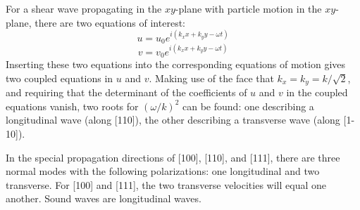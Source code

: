 \documentclass[10pt]{article}
\begin{document}
For a shear wave propagating in the $xy$-plane with particle motion in the $xy$-plane, there are two equations of interest:
$$
u = u_{0}e^{i(k_{x}x + k_{y}y - \omega t)}
$$
$$
v = v_{0}e^{i(k_{x}x + k_{y}y - \omega t)}
$$
Inserting these two equations into the corresponding equations of motion gives two coupled equations in $u$ and $v$. Making use of the
face that $k_{x} = k_{y} = k/\sqrt{2}$, and requiring that the determinant of the coefficients of $u$ and $v$ in the coupled equations vanish, two roots
for $(\omega/k)^{2}$ can be found: one describing a longitudinal wave (along [110]), the other describing a transverse wave (along [1-10]).

In the special propagation directions of [100], [110], and [111], there are three normal modes with the following polarizations: one longitudinal and two transverse.
For [100] and [111], the two transverse velocities will equal one another. Sound waves are longitudinal waves.
\end{document}
